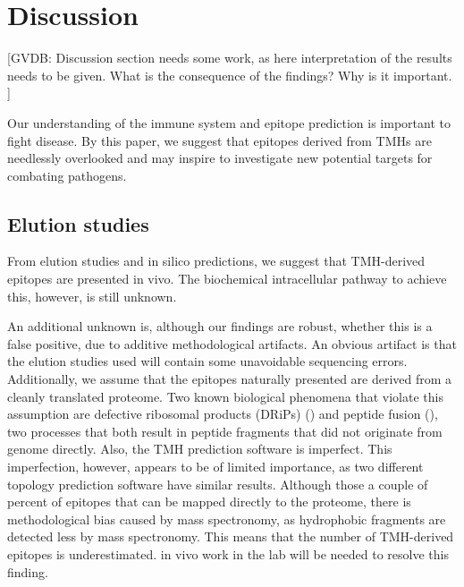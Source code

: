 \section{Discussion}

[GVDB: 
  Discussion section needs some work, 
  as here interpretation of the results needs to be given. 
  What is the consequence of the findings? Why is it important. 
]


Our understanding of the immune system and epitope prediction is 
important to fight disease. By this paper, we suggest that epitopes
derived from TMHs are needlessly overlooked and may inspire to investigate
new potential targets for combating pathogens.

\subsection{Elution studies}


From elution studies and in silico predictions, 
we suggest that TMH-derived epitopes are presented in vivo.
The biochemical intracellular pathway to achieve this,
however, is still unknown. 


An additional unknown is, although our findings are robust,
whether this is a false positive,
due to additive methodological artifacts.
An obvious artifact is that the elution studies used 
will contain some unavoidable sequencing errors.
Additionally, we assume that the epitopes naturally presented
are derived from a cleanly translated proteome.
Two known biological phenomena that violate this assumption
are defective ribosomal products (DRiPs) (\cite{yewdell1996defective}) 
and peptide fusion (\cite{delong2016pathogenic}),
two processes that both result in peptide fragments
that did not originate from genome directly.
Also, the TMH prediction software is imperfect.
This imperfection, however, appears to be of limited importance,
as two different topology prediction software have similar results.
Although those a couple of percent of epitopes that 
can be mapped directly to the proteome,
there is methodological bias caused by mass spectronomy,
as hydrophobic fragments are detected less 
by mass spectronomy. This means that the number of TMH-derived epitopes
is underestimated.
in vivo work in the lab will be needed to resolve this finding.

